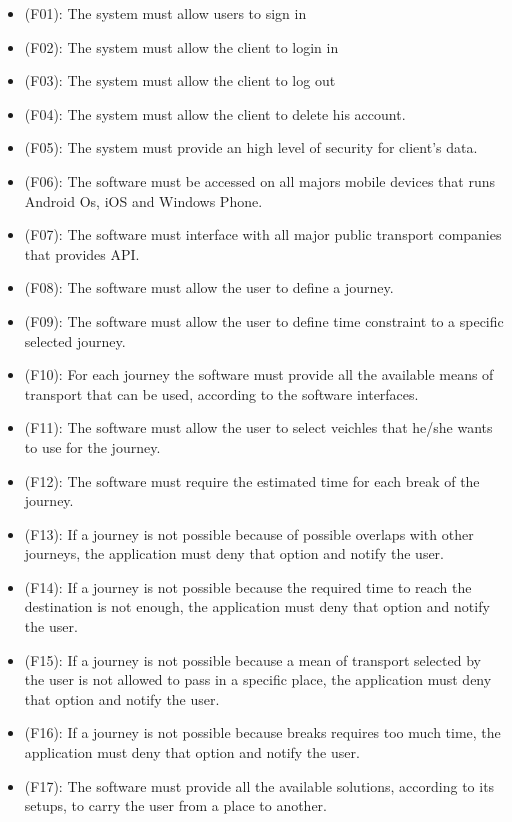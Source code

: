 \documentclass[a4paper]{book}
\begin{document}
\begin{itemize}

\item (F01): The system must allow users to sign in
\item (F02): The system must allow the client to login in
\item (F03): The system must allow the client to log out
\item (F04): The system must allow the client to delete his account.
\item (F05): The system must provide an high level of security for client's data.
\item (F06): The software must be accessed on all majors mobile devices that runs Android Os, iOS and Windows Phone.
\item (F07): The software must interface with all major public transport companies that provides API.
\item (F08): The software must allow the user to define a journey.
\item (F09): The software must allow the user to define time constraint to a specific selected journey.
\item (F10): For each journey the software must provide all the available means of transport that can be used, according to the software interfaces.
\item (F11): The software must allow the user to select veichles that he/she wants to use for the journey.
\item (F12): The software must require the estimated time for each break of the journey.
\item (F13): If a journey is not possible because of possible overlaps with other journeys, the application must deny that option and notify the user.
\item (F14): If a journey is not possible because the required time to reach the destination is not enough, the application must deny that option and notify the user.
\item (F15): If a journey is not possible because a mean of transport selected by the user is not allowed to pass in a specific place, the application must deny that option and notify the user.
\item (F16): If a journey is not possible because breaks requires too much time, the application must deny that option and notify the user.
\item (F17): The software must provide all the available solutions, according to its setups, to carry the user from a place to another.

\end{itemize}
\end{document}
